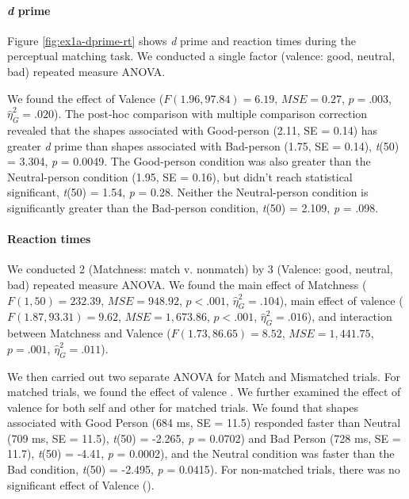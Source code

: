 \documentclass[
  english,
  man]{apa6}
\let\oldparagraph\paragraph
\renewcommand{\paragraph}[1]{\oldparagraph{#1}\mbox{}}
\begin{document}
\hypertarget{d-prime}{%
\paragraph{\texorpdfstring{\emph{d} prime}{d prime}}\label{d-prime}}

Figure \ref{fig:ex1a-dprime-rt} shows \emph{d} prime and reaction times during the perceptual matching task. We conducted a single factor (valence: good, neutral, bad) repeated measure ANOVA.

We found the effect of Valence (\(F(1.96, 97.84) = 6.19\), \(\mathit{MSE} = 0.27\), \(p = .003\), \(\hat{\eta}^2_G = .020\)). The post-hoc comparison with multiple comparison correction revealed that the shapes associated with Good-person (2.11, SE = 0.14) has greater \emph{d} prime than shapes associated with Bad-person (1.75, SE = 0.14), \emph{t}(50) = 3.304, \emph{p} = 0.0049. The Good-person condition was also greater than the Neutral-person condition (1.95, SE = 0.16), but didn't reach statistical significant, \emph{t}(50) = 1.54, \emph{p} = 0.28. Neither the Neutral-person condition is significantly greater than the Bad-person condition, \emph{t}(50) = 2.109, \emph{p} = .098.

\hypertarget{reaction-times}{%
\paragraph{Reaction times}\label{reaction-times}}

We conducted 2 (Matchness: match v. nonmatch) by 3 (Valence: good, neutral, bad) repeated measure ANOVA. We found the main effect of Matchness (\(F(1, 50) = 232.39\), \(\mathit{MSE} = 948.92\), \(p < .001\), \(\hat{\eta}^2_G = .104\)), main effect of valence (\(F(1.87, 93.31) = 9.62\), \(\mathit{MSE} = 1,673.86\), \(p < .001\), \(\hat{\eta}^2_G = .016\)), and interaction between Matchness and Valence (\(F(1.73, 86.65) = 8.52\), \(\mathit{MSE} = 1,441.75\), \(p = .001\), \(\hat{\eta}^2_G = .011\)).

We then carried out two separate ANOVA for Match and Mismatched trials. For matched trials, we found the effect of valence . We further examined the effect of valence for both self and other for matched trials. We found that shapes associated with Good Person (684 ms, SE = 11.5) responded faster than Neutral (709 ms, SE = 11.5), \emph{t}(50) = -2.265, \emph{p} = 0.0702) and Bad Person (728 ms, SE = 11.7), \emph{t}(50) = -4.41, \emph{p} = 0.0002), and the Neutral condition was faster than the Bad condition, \emph{t}(50) = -2.495, \emph{p} = 0.0415). For non-matched trials, there was no significant effect of Valence ().
\end{document}

